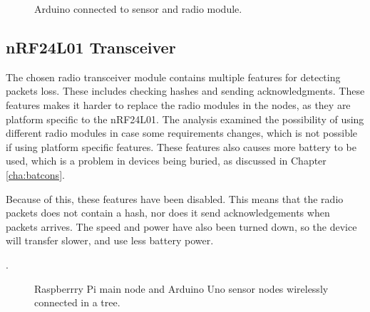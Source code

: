 \begin{figure}[!h]
	\centering
	\caption{Arduino connected to sensor and radio module.}
	\label{fig:compsketch}
\end{figure}

\subsection{nRF24L01 Transceiver}
The chosen radio transceiver module contains multiple features for detecting packets loss. These includes checking hashes and sending acknowledgments\cite{nf24datasheet}.
These features makes it harder to replace the radio modules in the nodes, as they are platform specific to the nRF24L01. The analysis examined the possibility of using different radio modules in case some requirements changes, which is not possible if using platform specific features. These features also causes more battery to be used, which is a problem in devices being buried, as discussed in Chapter \ref{cha:batcons}.

Because of this, these features have been disabled. This means that the radio packets does not contain a hash, nor does it send acknowledgements when packets arrives. The speed and power have also been turned down, so the device will transfer slower, and use less battery power.

.

\begin{figure}[!h]
	\centering
	\caption{Raspberrry Pi main node and Arduino Uno sensor nodes wirelessly connected in a tree.}
	\label{fig:raspbuinoTree}
\end{figure}
